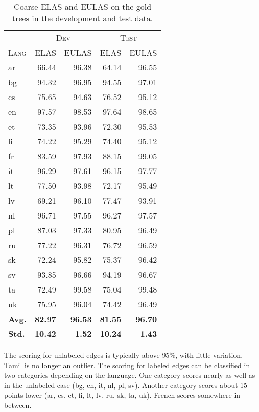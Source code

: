 \documentclass[11pt,a4paper]{article}
\begin{document}
\begin{table}[ht]
	\centering
    \small
	\begin{tabular}{l|rrrr}
        & \multicolumn{2}{c}{\textsc{Dev}} & \multicolumn{2}{c}{\textsc{Test}} \\
		\textsc{Lang} & \textsc{ELAS} & \textsc{EULAS} & \textsc{ELAS} & \textsc{EULAS} \\
		\hline 
		ar & 66.44 & 96.38 & 64.14 & 96.55 \\
		bg & 94.32 & 96.95 & 94.55 & 97.01 \\
		cs & 75.65 & 94.63 & 76.52 & 95.12 \\
		en & 97.57 & 98.53 & 97.64 & 98.65 \\
		et & 73.35 & 93.96 & 72.30 & 95.53 \\
		fi & 74.22 & 95.29 & 74.40 & 95.12 \\
		fr & 83.59 & 97.93 & 88.15 & 99.05 \\
		it & 96.29 & 97.61 & 96.15 & 97.77 \\
		lt & 77.50 & 93.98 & 72.17 & 95.49 \\
		lv & 69.21 & 96.10 & 77.47 & 93.91 \\
		nl & 96.71 & 97.55 & 96.27 & 97.57 \\
		pl & 87.03 & 97.33 & 80.95 & 96.49 \\
		ru & 77.22 & 96.31 & 76.72 & 96.59 \\
		sk & 72.24 & 95.82 & 75.37 & 96.42 \\
		sv & 93.85 & 96.66 & 94.19 & 96.67 \\
		ta & 72.49 & 99.58 & 75.04 & 99.48 \\
		uk & 75.95 & 96.04 & 74.42 & 96.49 \\
		\textbf{Avg.} & \textbf{82.97}  & \textbf{96.53}& \textbf{81.55} & \textbf{96.70} \\
        \textbf{Std.} & \textbf{10.42} & \textbf{1.52} & \textbf{10.24} & \textbf{1.43} \\
	\end{tabular}
	\caption{\label{tab:gold-data}Coarse ELAS and EULAS on the gold trees in the development and test data.}
\end{table} 

The scoring for unlabeled edges is typically above 95\%, with little
variation. Tamil is no longer an outlier. The scoring for labeled
edges can be classified in two categories depending on the
language. One category scores nearly as well as in the unlabeled case
(bg, en, it, nl, pl, sv). Another category scores about 15 points
lower (ar, cs, et, fi, lt, lv, ru, sk, ta, uk). French scores
somewhere in-between.
\end{document}

